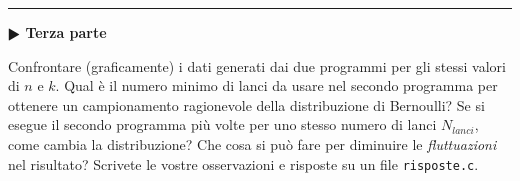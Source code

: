 \documentclass[11pt]{article}
\begin{document}
\hrule
\vspace{2mm}
\textbf{$\RHD$ Terza parte}
\vspace{2mm}

Confrontare (graficamente) i dati generati dai due programmi per gli stessi valori di $n$ e $k$.
Qual \`e il numero minimo di lanci da usare nel secondo programma per ottenere un campionamento ragionevole
della distribuzione di Bernoulli? Se si esegue il secondo programma pi\`u volte per uno stesso numero di lanci
$N_{lanci}$, come cambia la distribuzione? Che cosa si pu\`o fare per diminuire le {\em fluttuazioni\/} nel risultato?
Scrivete le vostre osservazioni e risposte su un file \texttt{risposte.c}.
\end{document}

